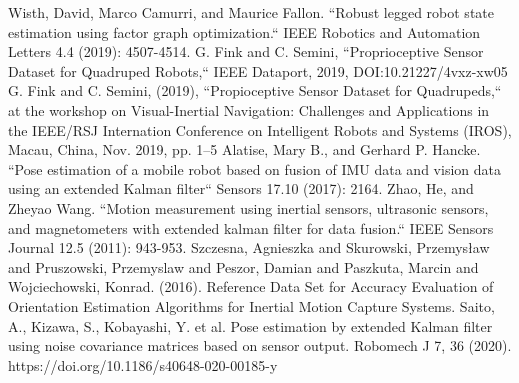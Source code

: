\documentclass[conference]{IEEEtran}
\begin{document}
\begin{thebibliography}{00}
 Wisth, David, Marco Camurri, and Maurice Fallon. ``Robust legged robot state estimation using factor graph optimization.`` IEEE Robotics and Automation Letters 4.4 (2019): 4507-4514.
 G. Fink and C. Semini, ``Proprioceptive Sensor Dataset for Quadruped Robots,`` IEEE Dataport, 2019, DOI:10.21227/4vxz-xw05
 G. Fink and C. Semini, (2019), ``Propioceptive Sensor Dataset for Quadrupeds,`` at the workshop on Visual-Inertial Navigation: Challenges and Applications in the IEEE/RSJ Internation Conference on Intelligent Robots and Systems (IROS), Macau, China, Nov. 2019, pp. 1–5
 Alatise, Mary B., and Gerhard P. Hancke. ``Pose estimation of a mobile robot based on fusion of IMU data and vision data using an extended Kalman filter`` Sensors 17.10 (2017): 2164.
 Zhao, He, and Zheyao Wang. ``Motion measurement using inertial sensors, ultrasonic sensors, and magnetometers with extended kalman filter for data fusion.`` IEEE Sensors Journal 12.5 (2011): 943-953.
 Szczesna, Agnieszka and Skurowski, Przemysław and Pruszowski, Przemyslaw and Peszor, Damian and Paszkuta, Marcin and Wojciechowski, Konrad. (2016). Reference Data Set for Accuracy Evaluation of Orientation Estimation Algorithms for Inertial Motion Capture Systems.
 Saito, A., Kizawa, S., Kobayashi, Y. et al. Pose estimation by extended Kalman filter using noise covariance matrices based on sensor output. Robomech J 7, 36 (2020). https://doi.org/10.1186/s40648-020-00185-y
\end{thebibliography}
\end{document}
